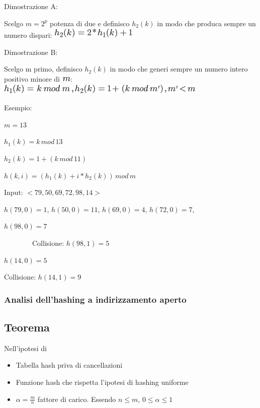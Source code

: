 \documentclass{article}
\providecommand{\tightlist}{%
  \setlength{\itemsep}{0pt}\setlength{\parskip}{0pt}}
\begin{document}
{Dimostrazione A}{:}

{Scelgo $m=2^p$ potenza di due e definisco $h_2(k)$ in modo che produca sempre un numero dispari: }\includegraphics{images/image304.png}

{Dimostrazione B}{:}

{Scelgo m primo, definisco $h_2(k)$ in modo che generi sempre un numero intero positivo minore di }\includegraphics{images/image235.png}{: }\includegraphics{images/image305.png}

{Esempio:}

$m=13$

$h_1(k)=k\,mod\,13$

$h_2(k)=1 + (k\,mod\,11)$

$h(k,i) = (h_1(k) + i * h_2(k))\,mod\,m$

{Input: $<79,50,69,72,98,14>$}

{}

$h(79,0)=1$, $h(50,0)=11$, $h(69,0)=4$, $h(72,0)=7$, 

$h(98,0)=7$

{~~~~~~~~Collisione: $h(98,1) = 5$}

$h(14,0)=5$

{Collisione: $h(14,1) = 9$}

\hypertarget{h.wkyvylqq2lrt}{\subsubsection{\texorpdfstring{{Analisi dell'hashing a indirizzamento aperto}}{Analisi dell'hashing a indirizzamento aperto}}\label{h.wkyvylqq2lrt}}

{}

\subsection{Teorema}

{Nell'ipotesi di}

\begin{itemize}
\tightlist
\item
  {Tabella hash priva di cancellazioni}
\item
  {Funzione hash che rispetta l'ipotesi di hashing uniforme}
\item
  {$\alpha = \frac{m}{n}$ fattore di carico. Essendo $n \leq m$, $0 \leq \alpha \leq 1$}
\end{itemize}
\end{document}
